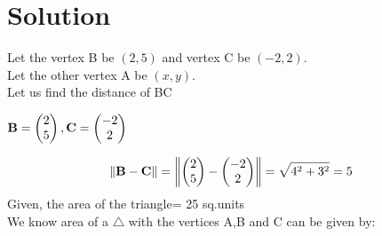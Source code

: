 \documentclass[journal,12pt,twocolumn]{IEEEtran}
\begin{document}
\noindent
\section*{\textbf{Solution}}
\noindent
Let the vertex B be $(2,5)$ and vertex C be $(-2,2)$.\\[6pt]
Let the other vertex A be $(x,y)$.\\[6pt]
Let us find the distance of BC
\begin{center}
$\mathbf{B} = \begin{pmatrix}2\\5\end{pmatrix}, \mathbf{C} =\begin{pmatrix}-2\\2\end{pmatrix}$
\end{center}
$$\left\|\mathbf{B-C}\right\|=\left\|\mathbf{\begin{pmatrix}2\\5\end{pmatrix}-\begin{pmatrix}-2\\2\end{pmatrix}}\right\|=\sqrt{4^2+3^2}=5$$
Given, the area of the triangle= 25 sq.units\\
We know area of a $\triangle$ with the vertices A,B and C
can be given by:
\end{document}
